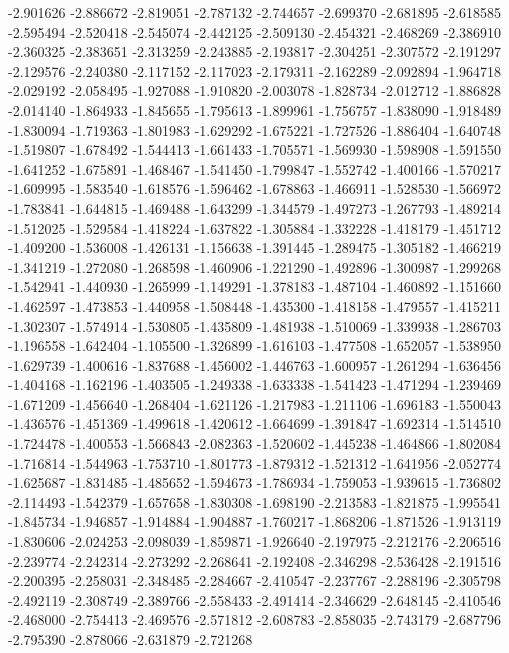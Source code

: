 -2.901626
-2.886672
-2.819051
-2.787132
-2.744657
-2.699370
-2.681895
-2.618585
-2.595494
-2.520418
-2.545074
-2.442125
-2.509130
-2.454321
-2.468269
-2.386910
-2.360325
-2.383651
-2.313259
-2.243885
-2.193817
-2.304251
-2.307572
-2.191297
-2.129576
-2.240380
-2.117152
-2.117023
-2.179311
-2.162289
-2.092894
-1.964718
-2.029192
-2.058495
-1.927088
-1.910820
-2.003078
-1.828734
-2.012712
-1.886828
-2.014140
-1.864933
-1.845655
-1.795613
-1.899961
-1.756757
-1.838090
-1.918489
-1.830094
-1.719363
-1.801983
-1.629292
-1.675221
-1.727526
-1.886404
-1.640748
-1.519807
-1.678492
-1.544413
-1.661433
-1.705571
-1.569930
-1.598908
-1.591550
-1.641252
-1.675891
-1.468467
-1.541450
-1.799847
-1.552742
-1.400166
-1.570217
-1.609995
-1.583540
-1.618576
-1.596462
-1.678863
-1.466911
-1.528530
-1.566972
-1.783841
-1.644815
-1.469488
-1.643299
-1.344579
-1.497273
-1.267793
-1.489214
-1.512025
-1.529584
-1.418224
-1.637822
-1.305884
-1.332228
-1.418179
-1.451712
-1.409200
-1.536008
-1.426131
-1.156638
-1.391445
-1.289475
-1.305182
-1.466219
-1.341219
-1.272080
-1.268598
-1.460906
-1.221290
-1.492896
-1.300987
-1.299268
-1.542941
-1.440930
-1.265999
-1.149291
-1.378183
-1.487104
-1.460892
-1.151660
-1.462597
-1.473853
-1.440958
-1.508448
-1.435300
-1.418158
-1.479557
-1.415211
-1.302307
-1.574914
-1.530805
-1.435809
-1.481938
-1.510069
-1.339938
-1.286703
-1.196558
-1.642404
-1.105500
-1.326899
-1.616103
-1.477508
-1.652057
-1.538950
-1.629739
-1.400616
-1.837688
-1.456002
-1.446763
-1.600957
-1.261294
-1.636456
-1.404168
-1.162196
-1.403505
-1.249338
-1.633338
-1.541423
-1.471294
-1.239469
-1.671209
-1.456640
-1.268404
-1.621126
-1.217983
-1.211106
-1.696183
-1.550043
-1.436576
-1.451369
-1.499618
-1.420612
-1.664699
-1.391847
-1.692314
-1.514510
-1.724478
-1.400553
-1.566843
-2.082363
-1.520602
-1.445238
-1.464866
-1.802084
-1.716814
-1.544963
-1.753710
-1.801773
-1.879312
-1.521312
-1.641956
-2.052774
-1.625687
-1.831485
-1.485652
-1.594673
-1.786934
-1.759053
-1.939615
-1.736802
-2.114493
-1.542379
-1.657658
-1.830308
-1.698190
-2.213583
-1.821875
-1.995541
-1.845734
-1.946857
-1.914884
-1.904887
-1.760217
-1.868206
-1.871526
-1.913119
-1.830606
-2.024253
-2.098039
-1.859871
-1.926640
-2.197975
-2.212176
-2.206516
-2.239774
-2.242314
-2.273292
-2.268641
-2.192408
-2.346298
-2.536428
-2.191516
-2.200395
-2.258031
-2.348485
-2.284667
-2.410547
-2.237767
-2.288196
-2.305798
-2.492119
-2.308749
-2.389766
-2.558433
-2.491414
-2.346629
-2.648145
-2.410546
-2.468000
-2.754413
-2.469576
-2.571812
-2.608783
-2.858035
-2.743179
-2.687796
-2.795390
-2.878066
-2.631879
-2.721268
